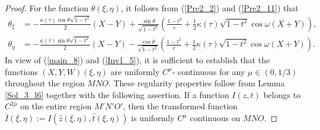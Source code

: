 \documentclass[3p,11pt]{elsarticle}
\numberwithin{equation}{section}
\begin{document}
\begin{proof}
   For the function $\theta(\xi,\eta)$, it follows from (\ref{Pre2_2}) and  (\ref{Pre2_11}) that
   \begin{equation}\label{main_8}
       \begin{split}
           \theta_\xi &= -\frac{\kappa(\tau)\cos\theta\sqrt{1-t^2}}{2}( X- Y)+\frac{\sin\theta}{\sqrt{1-t^2}}\left( \frac{1-t^2}{c}+\frac{1}{2}\kappa(\tau)\sqrt{1-t^2}\cos\omega( X+ Y)\right),\\
           \theta_\eta &=-\frac{\kappa(\tau)\sin\theta\sqrt{1-t^2}}{2}( X- Y)-\frac{\cos\theta}{\sqrt{1-t^2}}\left( \frac{1-t^2}{c}+\frac{1}{2}\kappa(\tau)\sqrt{1-t^2}\cos\omega( X+ Y)\right).
       \end{split}
   \end{equation}
   In view of (\ref{main_8}) and (\ref{Inv1_5}), it is sufficient to establish that the functions $( X, Y,W)(\xi,\eta)$ are uniformly $C^{\mu}$- continuous for any $\mu\in(0,1/3)$ throughout the region $MNO$. These regularity properties follow from Lemma \ref{Sol_3_l6} together with the following assertion. If a function $I(z,t)$ belongs to $C^{2\bar\mu}$ on the entire region $M'N'O'$, then the transformed function $\bar I(\xi,\eta):=I(\hat z(\xi,\eta),\hat t(\xi,\eta))$ is uniformly $C^{\bar\mu}$ continuous on $MNO$.


\end{proof}
\end{document}
